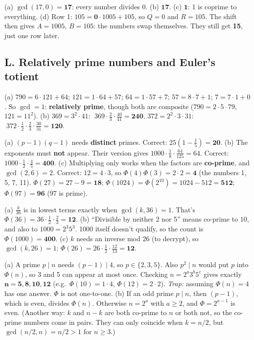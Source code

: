 \ans (a) $\gcd(17, 0) = \mathbf{17}$: every number divides 0.
(b) $\mathbf{17}$. (c) $\mathbf{1}$: 1 is coprime to everything.
(d) Row 1: $105 = \mathbf{0}\cdot1005 + 105$, so $Q = 0$ and $R = 105$. The shift then gives $A = 1005$, $B = 105$: the numbers swap themselves. They still get \textbf{15}, just one row later.

\subsection*{L. Relatively prime numbers and Euler's totient}

\ans (a) $790 = 6\cdot121 + 64$; $121 = 1\cdot64 + 57$; $64 = 1\cdot57 + 7$; $57 = 8\cdot7 + 1$; $7 = 7\cdot1 + 0$. So $\gcd = 1$: \textbf{relatively prime}, though both are composite ($790 = 2\cdot5\cdot79$, $121 = 11^2$).
(b) $369 = 3^2\cdot41$: $\;369\cdot\frac23\cdot\frac{40}{41} = \mathbf{240}$. \quad $372 = 2^2\cdot3\cdot31$: $\;372\cdot\frac12\cdot\frac23\cdot\frac{30}{31} = \mathbf{120}$.

\ans (a) $(p-1)(q-1)$ needs \textbf{distinct} primes. Correct: $25(1 - \frac15) = \mathbf{20}$.
(b) The exponents must \textbf{not} appear. Their version gives $1000\cdot\frac18\cdot\frac{64}{125} = 64$. Correct: $1000\cdot\frac12\cdot\frac45 = \mathbf{400}$.
(c) Multiplying only works when the factors are \textbf{co-prime}, and $\gcd(2, 6) = 2$. Correct: $12 = 4\cdot3$, so $\Phi(4)\Phi(3) = 2\cdot2 = \mathbf{4}$ (the numbers 1, 5, 7, 11).
$\Phi(27) = 27 - 9 = \mathbf{18}$; \;$\Phi(1024) = \Phi(2^{10}) = 1024 - 512 = \mathbf{512}$; \;$\Phi(97) = \mathbf{96}$ (97 is prime).

\ans (a) $\frac{k}{36}$ is in lowest terms exactly when $\gcd(k, 36) = 1$. That's $\Phi(36) = 36\cdot\frac12\cdot\frac23 = \mathbf{12}$.
(b) ``Divisible by neither 2 nor 5'' means co-prime to $10$, and also to $1000 = 2^3 5^3$. 1000 itself doesn't qualify, so the count is $\Phi(1000) = \mathbf{400}$.
(c) $k$ needs an inverse mod 26 (to decrypt), so $\gcd(k, 26) = 1$: $\Phi(26) = 26\cdot\frac12\cdot\frac{12}{13} = \mathbf{12}$.

\ans (a) A prime $p \mid n$ needs $(p - 1) \mid 4$, so $p \in \{2, 3, 5\}$. Also $p^2 \mid n$ would put $p$ into $\Phi(n)$, so 3 and 5 can appear at most once.
Checking $n = 2^a 3^b 5^c$ gives exactly $\mathbf{n = 5, 8, 10, 12}$ (e.g.\ $\Phi(10) = 1\cdot4$, $\Phi(12) = 2\cdot2$).
\emph{Trap:} assuming $\Phi(n) = 4$ has one answer. $\Phi$ is not one-to-one.
(b) If an odd prime $p \mid n$, then $(p - 1)$, which is even, divides $\Phi(n)$. Otherwise $n = 2^a$ with $a \ge 2$, and $\Phi = 2^{a-1}$ is even.
(Another way: $k$ and $n - k$ are both co-prime to $n$ or both not, so the co-prime numbers come in pairs. They can only coincide when $k = n/2$, but $\gcd(n/2, n) = n/2 > 1$ for $n \ge 3$.)

